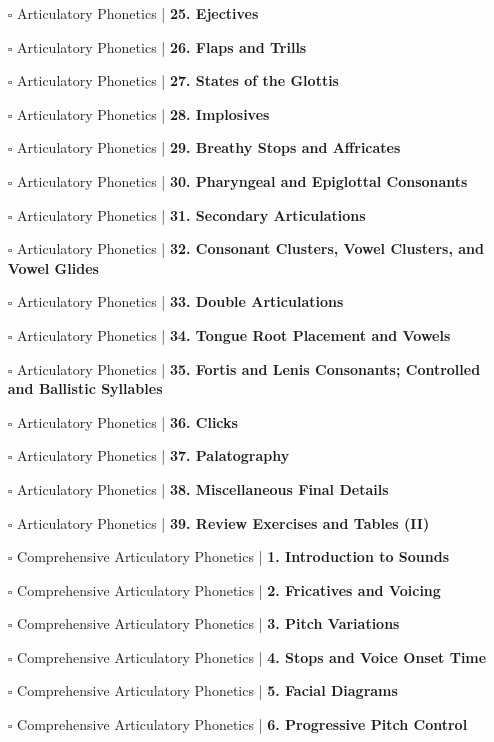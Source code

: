 \documentclass[a4, landscape, 12pt]{article}
\newcommand{\checkbox}{$\square$}%
\begin{document}
\begin{itemize}
{}
\item [\checkbox]  Articulatory Phonetics | \textbf{ 25. Ejectives
}
\item [\checkbox]  Articulatory Phonetics | \textbf{ 26. Flaps and Trills
}
\item [\checkbox]  Articulatory Phonetics | \textbf{ 27. States of the Glottis
}
\item [\checkbox]  Articulatory Phonetics | \textbf{ 28. Implosives
}
\item [\checkbox]  Articulatory Phonetics | \textbf{ 29. Breathy Stops and Affricates
}
\item [\checkbox]  Articulatory Phonetics | \textbf{ 30. Pharyngeal and Epiglottal Consonants
}
\item [\checkbox]  Articulatory Phonetics | \textbf{ 31. Secondary Articulations
}
\item [\checkbox]  Articulatory Phonetics | \textbf{ 32. Consonant Clusters, Vowel Clusters, and Vowel Glides
}
\item [\checkbox]  Articulatory Phonetics | \textbf{ 33. Double Articulations
}
\item [\checkbox]  Articulatory Phonetics | \textbf{ 34. Tongue Root Placement and Vowels
}
\item [\checkbox]  Articulatory Phonetics | \textbf{ 35. Fortis and Lenis Consonants; Controlled and Ballistic Syllables
}
\item [\checkbox]  Articulatory Phonetics | \textbf{ 36. Clicks
}
\item [\checkbox]  Articulatory Phonetics | \textbf{ 37. Palatography
}
\item [\checkbox]  Articulatory Phonetics | \textbf{ 38. Miscellaneous Final Details
}
\item [\checkbox]  Articulatory Phonetics | \textbf{ 39. Review Exercises and Tables (II)
}
\item [\checkbox]  Comprehensive Articulatory Phonetics | \textbf{ 1. Introduction to Sounds
}
\item [\checkbox]  Comprehensive Articulatory Phonetics | \textbf{ 2. Fricatives and Voicing
}
\item [\checkbox]  Comprehensive Articulatory Phonetics | \textbf{ 3. Pitch Variations
}
\item [\checkbox]  Comprehensive Articulatory Phonetics | \textbf{ 4. Stops and Voice Onset Time
}
\item [\checkbox]  Comprehensive Articulatory Phonetics | \textbf{ 5. Facial Diagrams
}
\item [\checkbox]  Comprehensive Articulatory Phonetics | \textbf{ 6. Progressive Pitch Control
}
\end{itemize}
\end{document}
